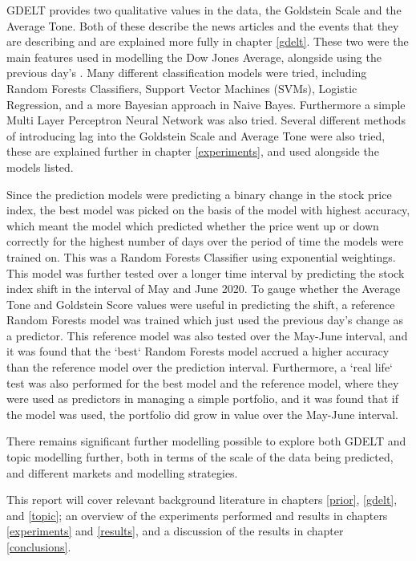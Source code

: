 GDELT provides two qualitative values in the data, the Goldstein Scale and the Average Tone. Both of these describe the news articles and the events that they are describing and are explained more fully in chapter \ref{gdelt}. These two were the main features used in modelling the Dow Jones Average, alongside using the previous day's . Many different classification models were tried, including Random Forests Classifiers, Support Vector Machines (SVMs), Logistic Regression, and a more Bayesian approach in Naive Bayes. Furthermore a simple Multi Layer Perceptron Neural Network was also tried. Several different methods of introducing lag into the Goldstein Scale and Average Tone were also tried, these are explained further in chapter \ref{experiments}, and used alongside the models listed. 

Since the prediction models were predicting a binary change in the stock price index, the best model was picked on the basis of the model with highest accuracy, which meant the model which predicted whether the price went up or down correctly for the highest number of days over the period of time the models were trained on. This was a Random Forests Classifier using exponential weightings. This model was further tested over a longer time interval by predicting the stock index shift in the interval of May and June 2020. To gauge whether the Average Tone and Goldstein Score values were useful in predicting the shift, a reference Random Forests model was trained which just used the previous day's change as a predictor. This reference model was also tested over the May-June interval, and it was found that the `best` Random Forests model accrued a higher accuracy than the reference model over the prediction interval. Furthermore, a `real life` test was also performed for the best model and the reference model, where they were used as predictors in managing a simple portfolio, and it was found that if the model was used, the portfolio did grow in value over the May-June interval.  

There remains significant further modelling possible to explore both GDELT and topic modelling further, both in terms of the scale of the data being predicted, and different markets and modelling strategies. 

This report will cover relevant background literature in chapters \ref{prior}, \ref{gdelt}, and \ref{topic};  an overview of the experiments performed and results in chapters \ref{experiments} and \ref{results}, and a discussion of the results in chapter \ref{conclusions}.